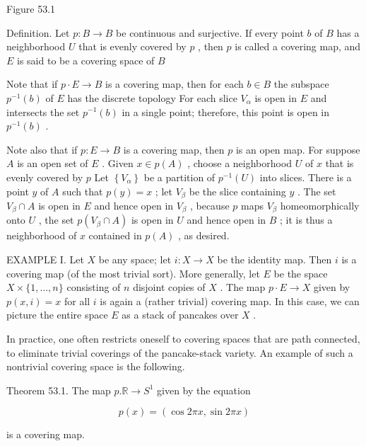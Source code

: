 Figure 53.1

Definition. Let \(p : B \rightarrow  B\) be continuous and surjective. If every point \(b\) of \(B\) has a neighborhood \(U\) that is evenly covered by \(p\) , then \(p\) is called a covering map, and \(E\) is said to be a covering space of \(B\)

Note that if \(p \cdot  E \rightarrow  B\) is a covering map, then for each \(b \in  B\) the subspace \({p}^{-1}\left( b\right)\) of \(E\) has the discrete topology For each slice \({V}_{\alpha }\) is open in \(E\) and intersects the set \({p}^{-1}\left( b\right)\) in a single point; therefore, this point is open in \({p}^{-1}\left( b\right)\) .

Note also that if \(p : E \rightarrow  B\) is a covering map, then \(p\) is an open map. For suppose \(A\) is an open set of \(E\) . Given \(x \in  p\left( A\right)\) , choose a neighborhood \(U\) of \(x\) that is evenly covered by \(p\) Let \(\left\{  {V}_{\alpha }\right\}\) be a partition of \({p}^{-1}\left( U\right)\) into slices. There is a point \(y\) of \(A\) such that \(p\left( y\right)  = x\) ; let \({V}_{\beta }\) be the slice containing \(y\) . The set \({V}_{\beta } \cap  A\) is open in \(E\) and hence open in \({V}_{\beta }\) , because \(p\) maps \({V}_{\beta }\) homeomorphically onto \(U\) , the set \(p\left( {{V}_{\beta } \cap  A}\right)\) is open in \(U\) and hence open in \(B\) ; it is thus a neighborhood of \(x\) contained in \(p\left( A\right)\) , as desired.

EXAMPLE I. Let \(X\) be any space; let \(i : X \rightarrow  X\) be the identity map. Then \(i\) is a covering map (of the most trivial sort). More generally, let \(E\) be the space \(X \times  \{ 1,\ldots ,n\}\) consisting of \(n\) disjoint copies of \(X\) . The map \(p \cdot  E \rightarrow  X\) given by \(p\left( {x,i}\right)  = x\) for all \(i\) is again a (rather trivial) covering map. In this case, we can picture the entire space \(E\) as a stack of pancakes over \(X\) .

In practice, one often restricts oneself to covering spaces that are path connected, to eliminate trivial coverings of the pancake-stack variety. An example of such a nontrivial covering space is the following.

Theorem 53.1. The map \(p.\mathbb{R} \rightarrow  {S}^{1}\) given by the equation

\[
p\left( x\right)  = \left( {\cos {2\pi x},\sin {2\pi x}}\right)
\]

is a covering map.

